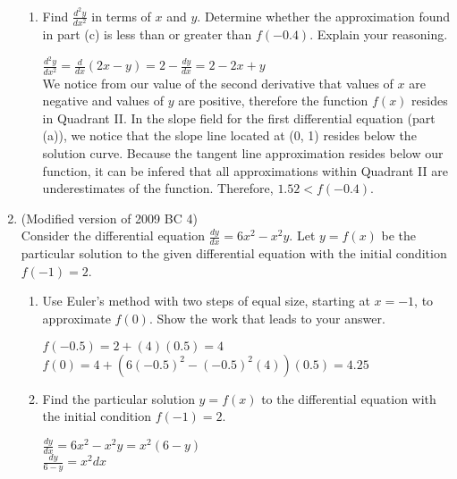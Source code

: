 \documentclass[10pt,letterpaper]{report}
\begin{document}
\begin{enumerate}
\begin{enumerate}
    \item{Find $\frac{d^{2}y}{dx^{2}}$ in terms of $x$ and $y$. Determine whether the approximation found in part (c) is less than or greater than $f(-0.4)$. Explain your reasoning. \\}
    
      $\frac{d^{2}y}{dx^{2}}=\frac{d}{dx}\left(2x-y\right)=2-\frac{dy}{dx}=2-2x+y$ \\
      
      We notice from our value of the second derivative that values of $x$ are negative and values of $y$ are positive, therefore the function $f(x)$ resides in Quadrant II. In the slope field for the first differential equation (part (a)), we notice that the slope line located at (0, 1) resides below the solution curve. Because the tangent line approximation resides below our function, it can be infered that all approximations within Quadrant II are underestimates of the function. Therefore, $1.52<f(-0.4)$. \\
      
      \pagebreak

  \end{enumerate}
  
  \item{(Modified version of 2009 BC 4) \\
  Consider the differential equation $\frac{dy}{dx}=6x^{2}-x^{2}y$. Let $y=f(x)$ be the particular solution to the given differential equation with the initial condition $f(-1)=2$.}
  \begin{enumerate}
    \item{Use Euler's method with two steps of equal size, starting at $x=-1$, to approximate $f(0)$. Show the work that leads to your answer. \\}
    
      $f(-0.5)=2+(4)(0.5)=4$ \\
      
      $f(0)=4+(6(-0.5)^{2}-(-0.5)^{2}(4))(0.5)=4.25$ \\
      
    \item{Find the particular solution $y=f(x)$ to the differential equation with the initial condition $f(-1)=2$. \\}
    
      $\frac{dy}{dx}=6x^{2}-x^{2}y=x^{2}\left(6-y\right)$ \\
      
      $\frac{dy}{6-y}=x^{2}dx$ \\
      

\end{enumerate}
\end{enumerate}
\end{document}
